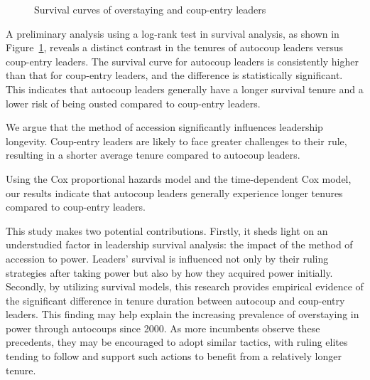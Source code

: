 \documentclass[
  12pt,
]{report}
\begin{document}
\begin{figure}


\caption{\label{fig-logrank}Survival curves of overstaying and
coup-entry leaders}

\end{figure}%

A preliminary analysis using a log-rank test in survival analysis, as
shown in Figure~\ref{fig-logrank}, reveals a distinct contrast in the
tenures of autocoup leaders versus coup-entry leaders. The survival
curve for autocoup leaders is consistently higher than that for
coup-entry leaders, and the difference is statistically significant.
This indicates that autocoup leaders generally have a longer survival
tenure and a lower risk of being ousted compared to coup-entry leaders.

We argue that the method of accession significantly influences
leadership longevity. Coup-entry leaders are likely to face greater
challenges to their rule, resulting in a shorter average tenure compared
to autocoup leaders.

Using the Cox proportional hazards model and the time-dependent Cox
model, our results indicate that autocoup leaders generally experience
longer tenures compared to coup-entry leaders.

This study makes two potential contributions. Firstly, it sheds light on
an understudied factor in leadership survival analysis: the impact of
the method of accession to power. Leaders' survival is influenced not
only by their ruling strategies after taking power but also by how they
acquired power initially. Secondly, by utilizing survival models, this
research provides empirical evidence of the significant difference in
tenure duration between autocoup and coup-entry leaders. This finding
may help explain the increasing prevalence of overstaying in power
through autocoups since 2000. As more incumbents observe these
precedents, they may be encouraged to adopt similar tactics, with ruling
elites tending to follow and support such actions to benefit from a
relatively longer tenure.
\end{document}
